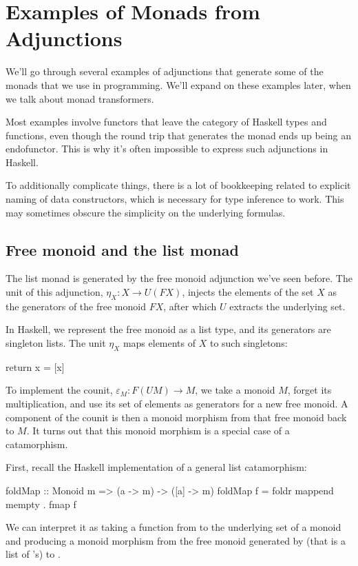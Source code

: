 \documentclass[DaoFP]{subfiles}
\begin{document}
\section{Examples of Monads from Adjunctions}

We'll go through several examples of adjunctions that generate some of the monads that we use in programming. We'll expand on these examples later, when we talk about monad transformers.

Most examples involve functors that leave the category of Haskell types and functions, even though the round trip that generates the monad ends up being an endofunctor. This is why it's often impossible to express such adjunctions in Haskell. 

To additionally complicate things, there is a lot of bookkeeping related to explicit naming of data constructors, which is necessary for type inference to work. This may sometimes obscure the simplicity on the underlying formulas.

\subsection{Free monoid and the list monad}
The list monad is generated by the free monoid adjunction we've seen before. The unit of this adjunction, $\eta_X \colon X \to U (F X)$, injects the elements of the set $X$ as the generators of the free monoid $F X$, after which $U$ extracts the underlying set. 

In Haskell, we represent the free monoid as a list type, and its generators are singleton lists. The unit $\eta_X$ maps elements of $X$ to such singletons:
\begin{haskell}
return x = [x]
\end{haskell}
To implement the counit, $\varepsilon_M \colon F (U M) \to M$, we take a monoid $M$, forget its multiplication, and use its set of elements as generators for a new free monoid. A component of the counit is then a monoid morphism from that free monoid back to $M$. It turns out that this monoid morphism is a special case of a catamorphism. 

First, recall the Haskell implementation of a general list catamorphism:
\begin{haskell}
foldMap :: Monoid m => (a -> m) -> ([a] -> m)
foldMap f = foldr mappend mempty . fmap f
\end{haskell}
We can interpret it as taking a function from  to the underlying set of a monoid  and producing a monoid morphism from the free monoid generated by  (that is a list of 's) to . 
\end{document}
